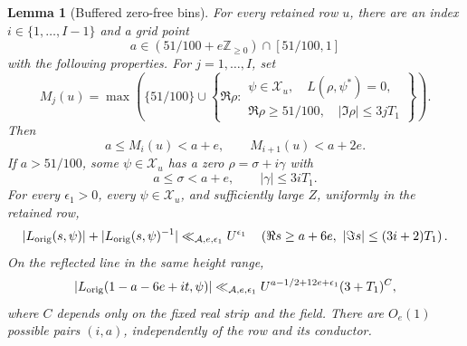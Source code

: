 \documentclass[11pt,a4paper]{article}
\numberwithin{equation}{section}
\numberwithin{figure}{section}
\newtheorem{lemma}[theorem]{Lemma}
\theoremstyle{definition}
\theoremstyle{remark}
\begin{document}
\begin{lemma}[Buffered zero-free bins]\label{lem:buffered-bins}
For every retained row \(u\), there are an index
\(i\in\{1,\ldots,I-1\}\) and a grid point
\[
 a\in(51/100+e\mathbb Z_{\ge0})\cap[51/100,1]
\]
with the following properties.  For \(j=1,\ldots,I\), set
\[
 M_j(u)=\max\left(\{51/100\}\cup
 \left\{\Re\rho:
 \begin{array}{l}
  \psi\in\mathcal X_u,\quad L(\rho,\psi^*)=0,\\
  \Re\rho\ge51/100,\quad |\Im\rho|\le3jT_1
 \end{array}\right\}\right).
\]
Then
\[
 a\le M_i(u)<a+e,\qquad M_{i+1}(u)<a+2e.
\]
If \(a>51/100\), some \(\psi\in\mathcal X_u\) has a zero
\(\rho=\sigma+i\gamma\) with
\[
 a\le\sigma<a+e,\qquad |\gamma|\le3iT_1.
\]
For every \(\epsilon_1>0\), every \(\psi\in\mathcal X_u\), and
sufficiently large \(Z\), uniformly in the retained row,
\[
 |L_{\rm orig}(s,\psi)|+|L_{\rm orig}(s,\psi)^{-1}|
 \ll_{\mathcal A,e,\epsilon_1} U^{\epsilon_1}
 \quad
 \left(\Re s\ge a+6e,\ |\Im s|\le(3i+2)T_1\right).
\]
On the reflected line in the same height range,
\[
 |L_{\rm orig}(1-a-6e+it,\psi)|
 \ll_{\mathcal A,e,\epsilon_1}
 U^{a-1/2+12e+\epsilon_1}(3+T_1)^C,
\]
where \(C\) depends only on the fixed real strip and the field.
There are \(O_e(1)\) possible pairs \((i,a)\), independently of
the row and its conductor.
\end{lemma}
\end{document}
